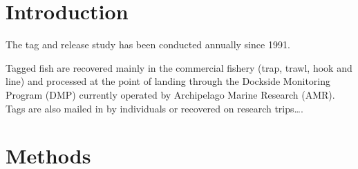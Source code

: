 \documentclass[12pt]{article}\usepackage[]{graphicx}\usepackage[]{color}
\begin{document}

\frontmatter


\renewcommand{\headrulewidth}{0.5pt}  %
\renewcommand{\footrulewidth}{0.5pt}  %

\hypertarget{introduction}{%
\section{Introduction}\label{introduction}}

The tag and release study has been conducted annually since 1991.

Tagged fish are recovered mainly in the commercial fishery (trap, trawl, hook and line) and processed at the point of landing through the Dockside Monitoring Program (DMP) currently operated by Archipelago Marine Research (AMR). Tags are also mailed in by individuals or recovered on research trips\ldots.

\hypertarget{methods}{%
\section{Methods}\label{methods}}
\end{document}
